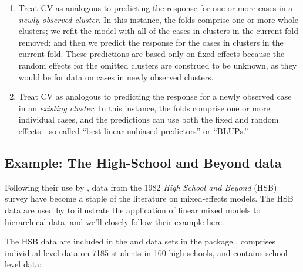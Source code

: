 \documentclass[
]{jss}
\begin{document}
\begin{enumerate}
\def\labelenumi{\arabic{enumi}.}
\item
  Treat CV as analogous to predicting the response for one or more cases
  in a \emph{newly observed cluster}. In this instance, the folds
  comprise one or more whole clusters; we refit the model with all of
  the cases in clusters in the current fold removed; and then we predict
  the response for the cases in clusters in the current fold. These
  predictions are based only on fixed effects because the random effects
  for the omitted clusters are construed to be unknown, as they would be
  for data on cases in newly observed clusters.
\item
  Treat CV as analogous to predicting the response for a newly observed
  case in an \emph{existing cluster}. In this instance, the folds
  comprise one or more individual cases, and the predictions can use
  both the fixed and random effects---so-called ``best-linear-unbiased
  predictors'' or ``BLUPs.''
\end{enumerate}

\subsection{Example: The High-School and Beyond
data}\label{example-the-high-school-and-beyond-data}

Following their use by \citet{RaudenbushBryk:2002}, data from the 1982
\emph{High School and Beyond} (HSB) survey have become a staple of the
literature on mixed-effects models. The HSB data are used by \citet[Sec.
7.2.2]{FoxWeisberg:2019} to illustrate the application of linear mixed
models to hierarchical data, and we'll closely follow their example
here.

The HSB data are included in the  and
 data sets in the  package
\citep{PinheiroBates:2000}.  comprises
individual-level data on 7185 students in 160 high schools, and
 contains school-level data:
\end{document}
